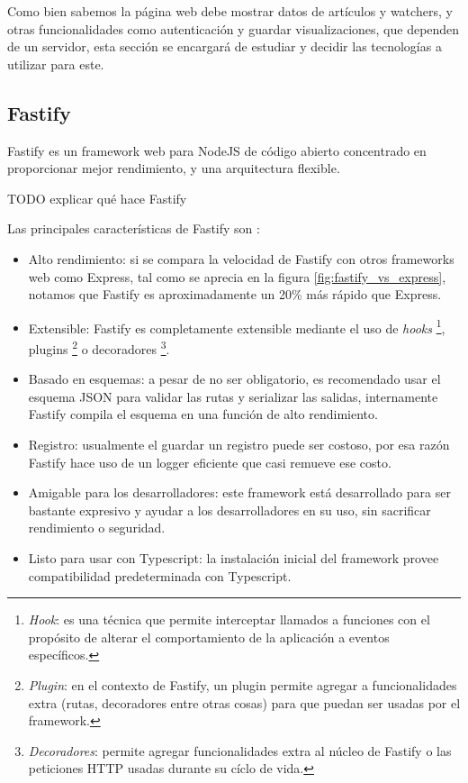 Como bien sabemos la página web debe mostrar datos de artículos y watchers, y otras funcionalidades como autenticación y guardar visualizaciones, que dependen de un servidor, esta sección se encargará de estudiar y decidir las tecnologías a utilizar para este.

\subsection{Fastify}

Fastify es un framework web para NodeJS de código abierto concentrado en proporcionar mejor rendimiento, y una arquitectura flexible. 

TODO explicar qué hace Fastify

Las principales características de Fastify son \cite{FastifyCoreFeatures}:

\begin{itemize}
    \item Alto rendimiento: si se compara la velocidad de Fastify con otros frameworks web como Express, tal como se aprecia en la figura \ref{fig:fastify_vs_express}, notamos que Fastify es aproximadamente un 20\% más rápido que Express.
    \item Extensible: Fastify es completamente extensible mediante el uso de \textit{hooks} \footnote{\textit{Hook}: es una técnica que permite interceptar llamados a funciones con el propósito de alterar el comportamiento de la aplicación a eventos específicos.}, plugins \footnote{\textit{Plugin}: en el contexto de Fastify, un plugin permite agregar a funcionalidades extra (rutas, decoradores entre otras cosas) para que puedan ser usadas por el framework.} o decoradores \footnote{\textit{Decoradores}: permite agregar funcionalidades extra al núcleo de Fastify o las peticiones HTTP usadas durante su cíclo de vida.}.
    \item Basado en esquemas: a pesar de no ser obligatorio, es recomendado usar el esquema JSON para validar las rutas y serializar las salidas, internamente Fastify compila el esquema en una función de alto rendimiento.
    \item Registro: usualmente el guardar un registro puede ser costoso, por esa razón Fastify hace uso de un logger eficiente que casi remueve ese costo.
    \item Amigable para los desarrolladores: este framework está desarrollado para ser bastante expresivo y ayudar a los desarrolladores en su uso, sin sacrificar rendimiento o seguridad.
    \item Listo para usar con Typescript: la instalación inicial del framework provee compatibilidad predeterminada con Typescript.
\end{itemize}


